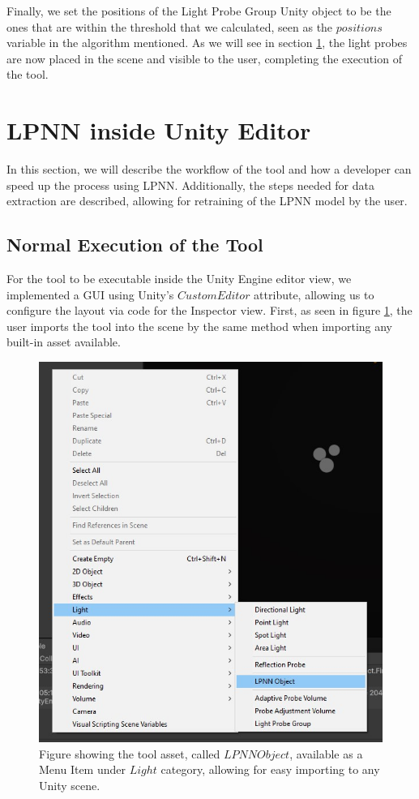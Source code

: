 Finally, we set the positions of the Light Probe Group Unity object to be the ones that are within the threshold that we calculated, seen as the $positions$ variable in the algorithm mentioned. As we will see in section \ref{sec:LPNN_UI}, the light probes are now placed in the scene and visible to the user, completing the execution of the tool.

\section{LPNN inside Unity Editor}
\label{sec:LPNN_UI}

In this section, we will describe the workflow of the tool and how a developer can speed up the process using LPNN. Additionally, the steps needed for data extraction are described, allowing for retraining of the LPNN model by the user.

\subsection{Normal Execution of the Tool}
\label{sec:LPNN_UI:normal}

For the tool to be executable inside the Unity Engine editor view, we implemented a GUI using Unity's $CustomEditor$ attribute, allowing us to configure the layout via code for the Inspector view. First, as seen in figure \ref{fig:UI_add}, the user imports the tool into the scene by the same method when importing any built-in asset available.

\begin{figure}[h]
	\centering
	\includegraphics[scale=0.6]{Graphics/UI_lpnn.jpg}
	\caption{Figure showing the tool asset, called $LPNN Object$, available as a Menu Item under $Light$ category, allowing for easy importing to any Unity scene.}
	\label{fig:UI_add}
\end{figure}

